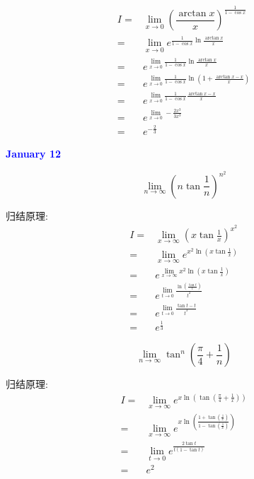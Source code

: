 \begin{solution}
	
	\begin{align*}
		I = & \lim\limits_{x\to 0}\left(\dfrac{\arctan x}{x}\right)^{\frac{1}{1-\cos x}}\\
		  = & \lim\limits_{x\to 0}e^{\frac{1}{1-\cos x}\ln\frac{\arctan x}{x}}\\
		  = & e^{\lim\limits_{x\to 0}\frac{1}{1-\cos x}\ln\frac{\arctan x}{x}}\\
		  = & e^{\lim\limits_{x\to 0}\frac{1}{1-\cos x}\ln(1+\frac{\arctan x-x}{x})}\\
		  = & e^{\lim\limits_{x\to 0}\frac{1}{1-\cos x}\frac{\arctan x-x}{x}}\\
		  = & e^{\lim\limits_{x\to 0}-\frac{2x^{3}}{3x^{3}}}\\
		  = & e^{-\frac{2}{3}}
	\end{align*}
\end{solution}

\textcolor{blue}{\textbf{January 12}}

\begin{example}[][Exam: 27.2.9]
	$$\lim\limits_{n\to \infty}\left(n\tan\frac{1}{n}\right)^{n^{2}}$$
\end{example}

\begin{solution}
	
	归结原理:
	\begin{align*}
		I = & \lim\limits_{x\to \infty}\left(x\tan\frac{1}{x}\right)^{x^{2}}\\
		  = & \lim\limits_{x\to \infty}e^{x^{2}\ln(x\tan\frac{1}{x})}\\
		  = & e^{\lim\limits_{x\to \infty}x^{2}\ln(x\tan\frac{1}{x})}\\
		  = & e^{\lim\limits_{t\to 0}\frac{\ln(\frac{\tan t}{t})}{t^{2}}}\\
		  = & e^{\lim\limits_{t\to 0}\frac{\tan t-t}{t^{3}}}\\
		  = & e^{\frac{1}{3}}
	\end{align*}
\end{solution}

\begin{example}[][Exam: 27.2.10]
	$$\lim\limits_{n\to \infty}\tan^{n}\left( \dfrac{\pi}{4}+\dfrac{1}{n}\right)$$
\end{example}

\begin{solution}
	
	归结原理:
	\begin{align*}
		I = & \lim\limits_{x\to \infty}e^{x\ln(\tan(\frac{\pi}{4}+\frac{1}{x}))}\\
		  = & \lim\limits_{x\to \infty}e^{x\ln(\frac{1+\tan(\frac{1}{x})}{1-\tan(\frac{1}{x})})}\\
		  = & \lim\limits_{t\to 0}e^{\frac{2\tan t}{t(1-\tan t)}}\\
		  = & e^{2}
	\end{align*}
\end{solution}

